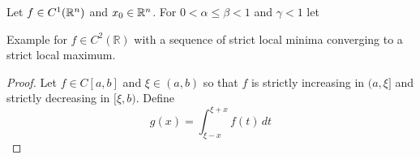 \begin{algorithm}\label{algo:golden_section_search}
\end{algorithm}
\inputminted[fontsize=\small, framesep=0.35cm, frame=lines, python3=true]{python}{python/golden_section.py}
\bigskip

\begin{algorithm}\label{algo:steepest_descent}
\end{algorithm}
Let \( f \in C^1(\mathbb{R}^n) \) and \( x_0 \in \mathbb{R}^n \). For \( 0 < \alpha \le \beta < 1 \) and \( \gamma < 1 \) let



\begin{exercise}
Example for \( f \in C^2(\mathbb{R}) \) with a sequence of strict local minima converging to a strict local maximum.
\end{exercise}

\begin{proof}
Let \( f \in C[a,b] \) and \( \xi \in (a, b) \) so that \( f \) is strictly increasing in \( (a,\xi] \) and
strictly decreasing in \( [\xi,b) \). Define
\[
    g(x) = \int_{\xi - x}^{\xi + x} f(t)\,dt
\]
\end{proof}
